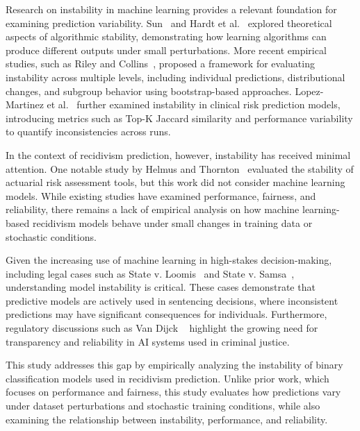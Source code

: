 \documentclass{article}
\begin{document}
Research on instability in machine learning provides a relevant foundation for examining prediction variability. Sun~\cite{sun2015stability} and Hardt et al.~\cite{hardt2016train} explored theoretical aspects of algorithmic stability, demonstrating how learning algorithms can produce different outputs under small perturbations. More recent empirical studies, such as Riley and Collins~\cite{riley2023stability}, proposed a framework for evaluating instability across multiple levels, including individual predictions, distributional changes, and subgroup behavior using bootstrap-based approaches. Lopez-Martinez et al.~\cite{lopez2022instability} further examined instability in clinical risk prediction models, introducing metrics such as Top-K Jaccard similarity and performance variability to quantify inconsistencies across runs.

In the context of recidivism prediction, however, instability has received minimal attention. One notable study by Helmus and Thornton~\cite{helmus2015stability} evaluated the stability of actuarial risk assessment tools, but this work did not consider machine learning models. While existing studies have examined performance, fairness, and reliability, there remains a lack of empirical analysis on how machine learning-based recidivism models behave under small changes in training data or stochastic conditions.

Given the increasing use of machine learning in high-stakes decision-making, including legal cases such as State v. Loomis~\cite{loomis2016} and State v. Samsa~\cite{samsa2014}, understanding model instability is critical. These cases demonstrate that predictive models are actively used in sentencing decisions, where inconsistent predictions may have significant consequences for individuals. Furthermore, regulatory discussions such as Van Dijck ~\cite{van2022predicting} highlight the growing need for transparency and reliability in AI systems used in criminal justice.

This study addresses this gap by empirically analyzing the instability of binary classification models used in recidivism prediction. Unlike prior work, which focuses on performance and fairness, this study evaluates how predictions vary under dataset perturbations and stochastic training conditions, while also examining the relationship between instability, performance, and reliability.
\end{document}
